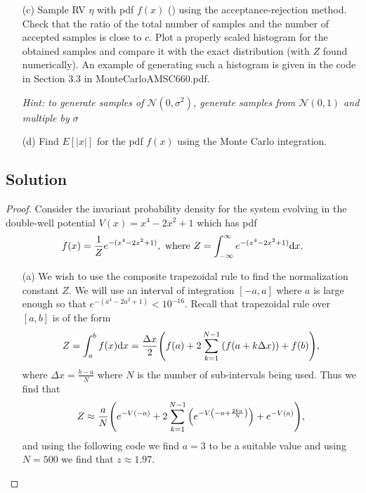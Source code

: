 \documentclass[12pt]{report}
\begin{document}
\begin{problem}
\begin{enumerate}
    \item [(c)]  Sample RV $\eta$ with pdf $f (x)$ () using the acceptance-rejection method. Check that the ratio of the total number of samples and the number of accepted samples is close to $c$. Plot a properly scaled histogram for the obtained samples and compare it with the exact distribution (with $Z$ found numerically). An example of generating such a histogram is given in the code in Section 3.3 in
    MonteCarloAMSC660.pdf.
    
    \noindent
    \textit{Hint: to generate samples of $\mathcal{N}(0,\sigma^2)$, generate samples from $\mathcal{N}(0,1)$ and multiple by $\sigma$}

    \item [(d)] 
    Find $E[|x|]$ for the pdf $f(x)$ using the Monte Carlo integration.



\end{enumerate}


\subsection*{Solution}
\begin{proof}

Consider the invariant probability density for the system evolving in the double-well potential $V(x) = x^4 - 2x^2 + 1$ which has pdf
\begin{equation}\label{p1eq}
    f(x) = \frac{1}{Z} e^{-(x^4 - 2x^2 + 1)}, ~\text{where}~ Z = \int_{-\infty}^\infty e^{-(x^4 - 2x^2 + 1)}{\mathrm{d}} x.
\end{equation}
\begin{enumerate}
    \item [(a)]
    We wish to use the composite trapezoidal rule to find the normalization constant $Z$. We will use an interval of integration $[-a,a]$ where $a$ is large enough so that $e^{-(a^4-2a^2 + 1)} < 10^{-16}$. Recall that trapezoidal rule over $[a,b]$ is of the form
    \begin{equation*}
        Z = \int_{a}^{b} f(x) {\mathrm{d}} x = \frac{\Delta x}{2}{\left(f(a) + 2\sum_{k=1}^{N-1} {\left(f(a + k\Delta x)\right)} + f(b)\right)}, 
    \end{equation*}
    where $\Delta x = \frac{b-a}{N}$ where $N$ is the number of sub-intervals being used. Thus we find that
    \begin{equation*}
        Z \approx \frac{a}{N}{\left(e^{-V(-a)} + 2\sum_{k=1}^{N-1} {\left(e^{-V{\left(-a + \frac{2ka}{N}\right)}}\right)} + e^{-V(a)}\right)},
    \end{equation*}
    and using the following code we find $a = 3$ to be a suitable value and using $N = 500$ we find that $z \approx 1.97$.


\end{enumerate}
\end{proof}
\end{problem}
\end{document}
